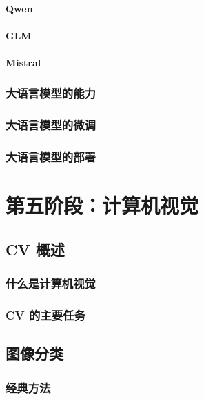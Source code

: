 \documentclass[12pt,UTF8]{ctexbook}
\begin{document}
\subsection{Qwen}

\subsection{GLM}

\subsection{Mistral}

\section{大语言模型的能力}

\section{大语言模型的微调}

\section{大语言模型的部署}

\part{第五阶段：计算机视觉}

\chapter{CV 概述}
\label{chap:cv_overview}

\section{什么是计算机视觉}

\section{CV 的主要任务}

\chapter{图像分类}
\label{chap:image_classification}

\section{经典方法}
\end{document}
